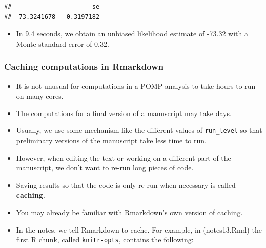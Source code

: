 \documentclass[]{article}
\newenvironment{Shaded}{\begin{snugshade}}{\end{snugshade}}
\newcommand{\KeywordTok}[1]{\textcolor[rgb]{0.13,0.29,0.53}{\textbf{#1}}}
\newcommand{\DataTypeTok}[1]{\textcolor[rgb]{0.13,0.29,0.53}{#1}}
\newcommand{\OtherTok}[1]{\textcolor[rgb]{0.56,0.35,0.01}{#1}}
\newcommand{\OperatorTok}[1]{\textcolor[rgb]{0.81,0.36,0.00}{\textbf{#1}}}
\newcommand{\NormalTok}[1]{#1}
\providecommand{\tightlist}{%
  \setlength{\itemsep}{0pt}\setlength{\parskip}{0pt}}
\begin{document}
\begin{verbatim}
##                      se 
## -73.3241678   0.3197182
\end{verbatim}

\begin{itemize}
\tightlist
\item
  In 9.4 seconds, we obtain an unbiased likelihood estimate of -73.32
  with a Monte standard error of 0.32.
\end{itemize}

\subsubsection{Caching computations in
Rmarkdown}\label{caching-computations-in-rmarkdown}

\begin{itemize}
\item
  It is not unusual for computations in a POMP analysis to take hours to
  run on many cores.
\item
  The computations for a final version of a manuscript may take days.
\item
  Usually, we use some mechanism like the different values of
  \texttt{run\_level} so that preliminary versions of the manuscript
  take less time to run.
\item
  However, when editing the text or working on a different part of the
  manuscript, we don't want to re-run long pieces of code.
\item
  Saving results so that the code is only re-run when necessary is
  called \textbf{caching}.
\item
  You may already be familiar with Rmarkdown's own version of caching.
\item
  In the notes, we tell Rmarkdown to cache. For example, in
  (notes13.Rmd) the first R chunk, called \texttt{knitr-opts}, contains
  the following:
\end{itemize}

\begin{Shaded}
\end{Shaded}
\end{document}
